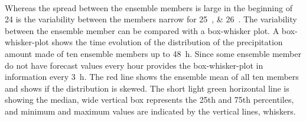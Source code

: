 \\
Whereas the spread between the ensemble members is large in the beginning of \SI{24}{\dec} is the variability between the members narrow for \SIlist{25;26}{\dec}. The variability between the ensemble member can be compared with a box-whisker plot. A box-whisker-plot shows the time evolution of the distribution of the precipitation amount made of ten ensemble members up to \SI{48}{\hour}. Since some ensemble member do not have forecast values every hour provides the box-whisker-plot in  information every \SI{3}{\hour}. The red line shows the ensemble mean of all ten members and shows if the distribution is skewed. The short light green horizontal line is showing the median, wide vertical box represents the 25th and 75th percentiles, and minimum and maximum values are indicated by the vertical lines, whiskers.
\\
